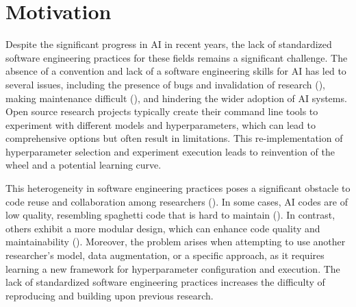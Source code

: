 
\section{Motivation}

Despite the significant progress in AI in recent years, the lack of standardized software engineering practices for these fields remains a significant challenge. The absence of a convention and lack of a software engineering skills for AI  has led to several issues, including the presence of bugs and invalidation of research (\cite{leakage-recrisis,epskamp2019reproducibilitybug, seAIsurvey, martinez2022softwareAI}), making maintenance difficult (\cite{mainatiblity}), and hindering the wider adoption of AI systems. Open source research projects typically create their command line tools to experiment with different models and hyperparameters, which can lead to comprehensive options but often result in limitations. This re-implementation of hyperparameter selection and experiment execution leads to reinvention of the wheel and a potential learning curve.

This heterogeneity in software engineering practices poses a significant obstacle to code reuse and collaboration among researchers (\cite{davis2011understandingmodularity}). In some cases, AI codes are of low quality, resembling spaghetti code that is hard to maintain (\cite{seAIsurvey,martinez2022softwareAI,amershi2019software,mainatiblity,leakage-recrisis,gezici2022systematicsoftware}). In contrast, others exhibit a more modular design, which can enhance code quality and maintainability (\cite{seAIsurvey,martinez2022softwareAI,wan2019does}). Moreover, the problem arises when attempting to use another researcher's model, data augmentation, or a specific approach, as it requires learning a new framework for hyperparameter configuration and execution. The lack of standardized software engineering practices increases the difficulty of reproducing and building upon previous research.



